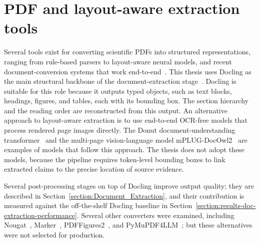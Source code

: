 \section{PDF and layout-aware extraction tools}\label{section:background-pdf-and-layout-aware-extraction-tools}

Several tools exist for converting scientific PDFs into structured representations, ranging from rule-based parsers to layout-aware neural models, and recent document-conversion systems that work end-to-end~\parencite{ramakrishnan2012layoutawaretextextraction, auer2024doclingtechnicalreport, blecher2023nougatneuraloptical, wang2024docllmlayoutawaregenerative}. This thesis uses Docling as the main structural backbone of the document-extraction stage~\parencite{auer2024doclingtechnicalreport}. Docling is suitable for this role because it outputs typed objects, such as text blocks, headings, figures, and tables, each with its bounding box. The section hierarchy and the reading order are reconstructed from this output. An alternative approach to layout-aware extraction is to use end-to-end OCR-free models that process rendered page images directly. The Donut document-understanding transformer~\parencite{kim2022ocrfreedocumentunderstanding} and the multi-page vision-language model mPLUG-DocOwl2~\parencite{hu2025mplugdocowl2highresolutioncompressing} are examples of models that follow this approach. The thesis does not adopt these models, because the pipeline requires token-level bounding boxes to link extracted claims to the precise location of source evidence.

Several post-processing stages on top of Docling improve output quality; they are described in Section~\ref{section:Document_Extraction}, and their contribution is measured against the off-the-shelf Docling baseline in Section~\ref{section:results-doc-extraction-performance}. Several other converters were examined, including Nougat~\parencite{blecher2023nougatneuraloptical}, Marker~\parencite{paruchuri2024marker}, PDFFigures2~\parencite{clark2016pdffigures2}, and PyMuPDF4LLM~\parencite{artifex2024pymupdf4llm}; but these alternatives were not selected for production.